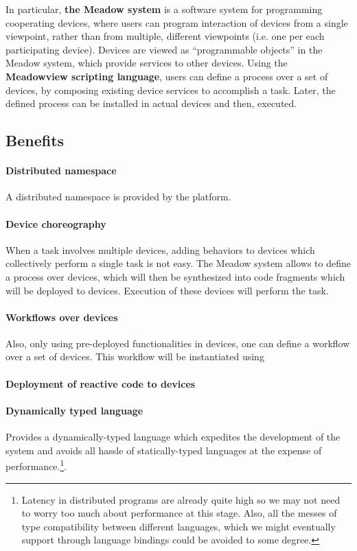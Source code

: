 \documentclass{note}
\begin{document}
In particular, \textcolor{blue2}{\textbf{the Meadow system}} is a software
system for programming cooperating devices, where users can program
interaction of devices from a single viewpoint, rather than from multiple,
different viewpoints (i.e. one per each participating device).
Devices are viewed as ``programmable objects'' in the Meadow system, 
which provide \textcolor{blue2}{services} to other devices.
Using the \textcolor{blue2}{\textbf{Meadowview scripting language}}, users 
can define a process over a set of devices, by composing existing device
services to accomplish a task.  
Later, the defined process can be installed in actual devices and then,
executed. 
 
\subsection{Benefits}
\paragraph{Distributed namespace}
A distributed namespace is provided by the platform.



\paragraph{Device choreography}
When a task involves multiple devices, adding behaviors to devices
  which collectively perform a single task is not easy. The Meadow system
  allows to define a process over devices, which will then be synthesized into
  code fragments which will be deployed to devices. Execution of these devices
  will perform the task.

\paragraph{Workflows over devices}
Also, only using pre-deployed functionalities in devices, one can define a
workflow over a set of devices. This workflow will be instantiated using 

\paragraph{Deployment of reactive code to devices}


\paragraph{Dynamically typed language}
Provides a dynamically-typed language which expedites the development of
   the system and avoids all hassle of statically-typed languages at the 
   expense of performance.\footnote{Latency in distributed programs are
     already quite high so we may not need to worry too much about performance
    at this stage. Also, all the messes of type compatibility between
    different languages, which we might eventually support through language
    bindings could be avoided to some degree.}.
\end{document}
